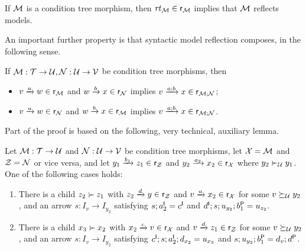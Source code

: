 \begin{corollary}
If $\cM$ is a condition tree morphism, then $\rtof\cM\in \rgen_\cM$ implies that $\cM$ reflects models.
\end{corollary}
%
An important further property is that syntactic model reflection composes, in the following sense.
%
\begin{proposition}\label{prop:syntactic reflection composes}
If $\cM:\cT\to\cU,\cN:\cU\to \cV$ be condition tree morphisms, then
\begin{itemize}
\item $\trip vaw\in \rgen_\cM$ and $\trip wbx\in \rgen_\cN$ implies $\trip v{a;b}x\in \rgen_{\cM;\cN}$;
\item $\trip vaw\in \rgen_\cN$ and $\trip wbx\in \rgen_\cM$ implies $\trip v{a;b}x\in \rgen_{\cM;\cN}$.
\end{itemize}
\end{proposition}
%
Part of the proof is based on the following, very technical, auxiliary lemma.
%
\begin{lemma}\label{lem:composition induction}
Let $\cM:\cT\to\cU$ and $\cN:\cU\to \cV$ be condition tree morphisms, let $\cX=\cM$ and $\cZ=\cN$ or vice versa, and let $\trip{y_1}{b_1}{z_1}\in \rgen_\cZ$ and $\trip{y_2}{a_2}{x_2}\in \rgen_\cX$ where $y_2\childof_\cU y_1$. One of the following cases holds:
\begin{enumerate}
\item There is a child $z_2\childof z_1$ with $\trip {z_2}dy\in\rgen_\cZ$ and $\trip va{x_2}\in \rgen_\cX$ for some $v\desceq_\cU y_2$, and an arrow $s:I_v\to I_{y_2}$ satisfying $s;a\I_2=c\I$ and $d\I;s;u_{y_2};b\P_1=u_{z_2}$.

\item There is a child $x_3\childof x_2$ with $\trip{x_2}cv\in \rgen_\cX$ and $\trip vd{z_1}\in \rgen_\cZ$ for some $v\desceq_\cU y_2$, and an arrow $s:I_v\to I_{y_2}$ satisfying $c\I;s;a\I_2;d_{x_2}=u_{x_3}$ and $s;u_{y_2};b\P_1=d_v;d\P$.
\end{enumerate}
\end{lemma}
%

